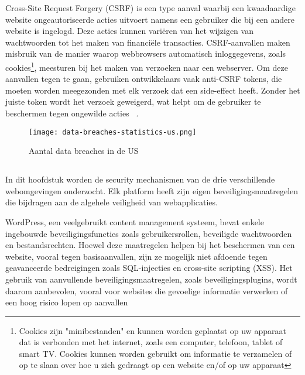 \subsubsection{}
\label{sec:brute force aanvallen}
Cross-Site Request Forgery (CSRF) is een type aanval waarbij een kwaadaardige website ongeautoriseerde acties uitvoert namens een gebruiker die bij een andere website is 
ingelogd. Deze acties kunnen variëren van het wijzigen van wachtwoorden tot het maken van financiële transacties. CSRF-aanvallen maken misbruik van de manier waarop 
webbrowsers automatisch inloggegevens, zoals cookies\footnote{Cookies zijn "minibestanden" en kunnen worden geplaatst op uw apparaat dat is verbonden met het internet, 
zoals een computer, telefoon, tablet of smart TV. Cookies kunnen worden gebruikt om informatie te verzamelen of op te slaan over hoe u zich gedraagt op een website 
en/of op uw apparaat}, meesturen bij het maken van verzoeken naar een webserver. Om deze aanvallen tegen te gaan, gebruiken ontwikkelaars 
vaak anti-CSRF tokens, die moeten worden meegezonden met elk verzoek dat een side-effect heeft. Zonder het juiste token wordt het verzoek geweigerd, wat helpt om de 
gebruiker te beschermen tegen ongewilde acties ~\autocite{B.I.2024}.

\begin{figure}
    \centering
    \texttt{[image: data-breaches-statistics-us.png]}
    \caption[Aantal data breaches in de US ]{Aantal data breaches in de US }
\end{figure}

\subsection{}
\label{sec:Security mechanismen in Webomgevingen}

In dit hoofdstuk worden de security mechanismen van de drie verschillende webomgevingen onderzocht. Elk platform heeft zijn eigen beveiligingsmaatregelen die bijdragen 
aan de algehele veiligheid van webapplicaties.

WordPress, een veelgebruikt content management systeem, bevat enkele ingebouwde beveiligingsfuncties zoals gebruikersrollen, beveiligde 
wachtwoorden en bestandsrechten. Hoewel deze maatregelen helpen bij het beschermen van een website, vooral tegen basisaanvallen, zijn ze 
mogelijk niet afdoende tegen geavanceerde bedreigingen zoals SQL-injecties en cross-site scripting (XSS). Het gebruik van aanvullende 
beveiligingsmaatregelen, zoals beveiligingsplugins, wordt daarom aanbevolen, vooral voor websites die gevoelige informatie verwerken 
of een hoog risico lopen op aanvallen~\autocite{Trunde2015}

